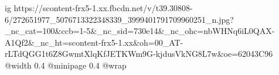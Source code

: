  
 
 
 
 

\ifcmt
  ig https://scontent-frx5-1.xx.fbcdn.net/v/t39.30808-6/272651977_5076713322348339_3999401791709960251_n.jpg?_nc_cat=100&ccb=1-5&_nc_sid=730e14&_nc_ohc=nbWHNq6iL0QAX-A1Qf2&_nc_ht=scontent-frx5-1.xx&oh=00_AT-rLTdQGG1t6Z8GwmtXlqKfJETKWm9G-kjdusVkNG8L7w&oe=62043C96
  @width 0.4
  @minipage 0.4
  @wrap \parpic[r]
\fi
